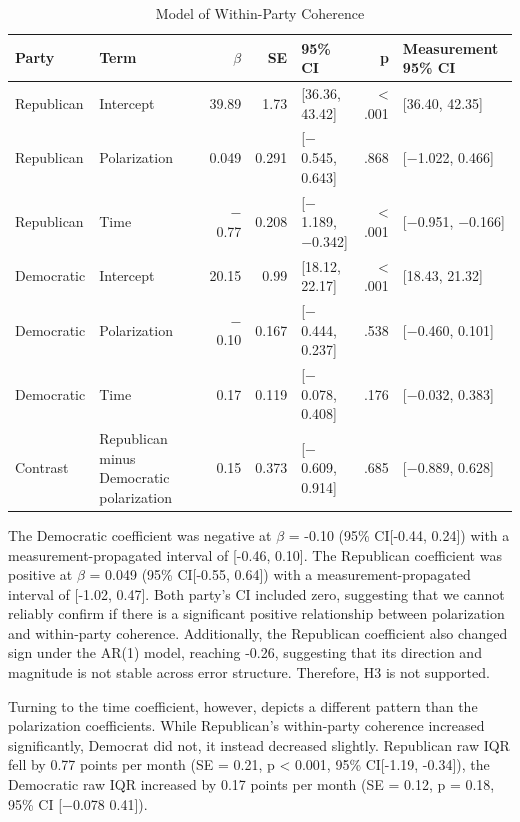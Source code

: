 \begin{table}[htbp]
\centering
\small
\begin{threeparttable}
\caption{Model of Within-Party Coherence}
\label{tab:8}
\begin{tabularx}{\textwidth}{@{}L{0.75}L{0.95}rrL{1.00}rL{1.05}@{}}
\toprule
\textbf{Party} & \textbf{Term} & \textbf{$\beta$} & \textbf{SE} & \textbf{95\% CI} & \textbf{p} & \textbf{Measurement 95\% CI} \\
\midrule
Republican & Intercept & 39.89 & 1.73 & [36.36, 43.42] & < .001 & [36.40, 42.35] \\
Republican & Polarization & 0.049 & 0.291 & [$-$0.545, 0.643] & .868 & [$-$1.022, 0.466] \\
Republican & Time & $-$0.77 & 0.208 & [$-$1.189, $-$0.342] & < .001 & [$-$0.951, $-$0.166] \\
Democratic & Intercept & 20.15 & 0.99 & [18.12, 22.17] & < .001 & [18.43, 21.32] \\
Democratic & Polarization & $-$0.10 & 0.167 & [$-$0.444, 0.237] & .538 & [$-$0.460, 0.101] \\
Democratic & Time & 0.17 & 0.119 & [$-$0.078, 0.408] & .176 & [$-$0.032, 0.383] \\
Contrast & Republican minus Democratic polarization & 0.15 & 0.373 & [$-$0.609, 0.914] & .685 & [$-$0.889, 0.628] \\
\bottomrule
\end{tabularx}
\end{threeparttable}
\end{table}



The Democratic coefficient was negative at $\beta$ = -0.10 (95\% CI[-0.44, 0.24]) with a measurement-propagated interval of [-0.46, 0.10]. The Republican coefficient was positive at $\beta$ = 0.049 (95\% CI[-0.55, 0.64]) with a measurement-propagated interval of [-1.02, 0.47]. Both party's CI included zero, suggesting that we cannot reliably confirm if there is a significant positive relationship between polarization and within-party coherence. Additionally, the Republican coefficient also changed sign under the AR(1) model, reaching -0.26, suggesting that its direction and magnitude is not stable across error structure. Therefore, H3 is not supported.

Turning to the time coefficient, however, depicts a different pattern than the polarization coefficients. While Republican's within-party coherence increased significantly, Democrat did not, it instead decreased slightly. Republican raw IQR fell by 0.77 points per month (SE = 0.21, p < 0.001, 95\% CI[-1.19, -0.34]), the Democratic raw IQR increased by 0.17 points per month (SE = 0.12, p = 0.18, 95\% CI [$-$0.078 0.41]).

